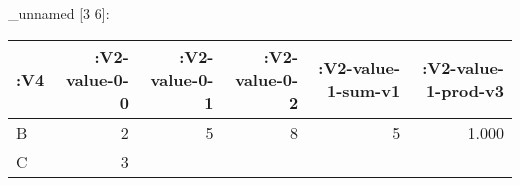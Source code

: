 \documentclass[]{article}
\begin{document}
\_unnamed {[}3 6{]}:

\begin{longtable}[]{@{}lrrrrr@{}}
\toprule
\begin{minipage}[b]{0.05\columnwidth}\raggedright\strut
:V4\strut
\end{minipage} & \begin{minipage}[b]{0.14\columnwidth}\raggedleft\strut
:V2-value-0-0\strut
\end{minipage} & \begin{minipage}[b]{0.14\columnwidth}\raggedleft\strut
:V2-value-0-1\strut
\end{minipage} & \begin{minipage}[b]{0.14\columnwidth}\raggedleft\strut
:V2-value-0-2\strut
\end{minipage} & \begin{minipage}[b]{0.18\columnwidth}\raggedleft\strut
:V2-value-1-sum-v1\strut
\end{minipage} & \begin{minipage}[b]{0.19\columnwidth}\raggedleft\strut
:V2-value-1-prod-v3\strut
\end{minipage}\tabularnewline
\midrule
\endhead
\begin{minipage}[t]{0.05\columnwidth}\raggedright\strut
B\strut
\end{minipage} & \begin{minipage}[t]{0.14\columnwidth}\raggedleft\strut
2\strut
\end{minipage} & \begin{minipage}[t]{0.14\columnwidth}\raggedleft\strut
5\strut
\end{minipage} & \begin{minipage}[t]{0.14\columnwidth}\raggedleft\strut
8\strut
\end{minipage} & \begin{minipage}[t]{0.18\columnwidth}\raggedleft\strut
5\strut
\end{minipage} & \begin{minipage}[t]{0.19\columnwidth}\raggedleft\strut
1.000\strut
\end{minipage}\tabularnewline
\begin{minipage}[t]{0.05\columnwidth}\raggedright\strut
C\strut
\end{minipage} & \begin{minipage}[t]{0.14\columnwidth}\raggedleft\strut
3\strut
\end{minipage} & \begin{minipage}[t]{0.14\columnwidth}\raggedleft\strut

\end{minipage}
\end{longtable}
\end{document}
